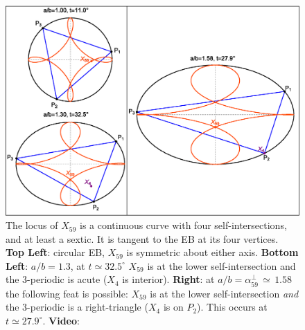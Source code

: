 \begin{figure}
    \centering
    \includegraphics[width=.8\textwidth]{pics/1050_x59_center.eps}
    \caption{The locus of $X_{59}$ is a continuous curve with four self-intersections, and at least a sextic. It is tangent to the EB at its four vertices. \textbf{Top Left}: circular EB, $X_{59}$ is symmetric about either axis. \textbf{Bottom Left}: $a/b=1.3$, at $t{\simeq}32.5^\circ$ $X_{59}$ is at the lower self-intersection and the 3-periodic is acute ($X_4$ is interior). \textbf{Right}: at $a/b=\alpha_{59}^\perp\,{\simeq}\,1.58$ the following feat is possible: $X_{59}$ is at the lower self-intersection {\em and} the 3-periodic is a right-triangle ($X_4$ is on $P_2$). This occurs at $t{\simeq}27.9^\circ$. \textbf{Video}: \cite[PL\#12]{reznik2020-playlist-intriguing}}
    \label{fig:x59-center}
\end{figure}